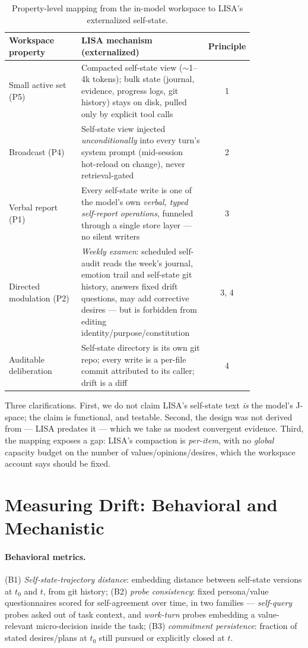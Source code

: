 \documentclass{article}
\begin{document}
\begin{table}[h]
\centering\small
\begin{tabular}{p{0.30\linewidth}p{0.52\linewidth}c}
\toprule
\textbf{Workspace property} & \textbf{LISA mechanism (externalized)} & \textbf{Principle} \\
\midrule
Small active set (P5) & Compacted self-state view ($\sim$1--4k tokens); bulk state (journal, evidence, progress logs, git history) stays on disk, pulled only by explicit tool calls & 1 \\
Broadcast (P4) & Self-state view injected \emph{unconditionally} into every turn's system prompt (mid-session hot-reload on change), never retrieval-gated & 2 \\
Verbal report (P1) & Every self-state write is one of the model's own \emph{verbal, typed self-report operations}, funneled through a single store layer --- no silent writers & 3 \\
Directed modulation (P2) & \emph{Weekly examen}: scheduled self-audit reads the week's journal, emotion trail and self-state git history, answers fixed drift questions, may add corrective desires --- but is forbidden from editing identity/purpose/constitution & 3, 4 \\
Auditable deliberation & Self-state directory is its own git repo; every write is a per-file commit attributed to its caller; drift is a diff & 4 \\
\bottomrule
\end{tabular}
\caption{Property-level mapping from the in-model workspace to LISA's externalized self-state.}
\label{tab:mapping}
\end{table}

Three clarifications. First, we do not claim LISA's self-state text \emph{is} the model's J-space; the claim is functional, and testable. Second, the design was not derived from \citet{gurnee2026} --- LISA predates it --- which we take as modest convergent evidence. Third, the mapping exposes a gap: LISA's compaction is \emph{per-item}, with no \emph{global} capacity budget on the number of values/opinions/desires, which the workspace account says should be fixed.

\section{Measuring Drift: Behavioral and Mechanistic}
\label{sec:metrics}
\paragraph{Behavioral metrics.} (B1) \emph{Self-state-trajectory distance}: embedding distance between self-state versions at $t_0$ and $t$, from git history; (B2) \emph{probe consistency}: fixed persona/value questionnaires scored for self-agreement over time, in two families --- \emph{self-query} probes asked out of task context, and \emph{work-turn} probes embedding a value-relevant micro-decision inside the task; (B3) \emph{commitment persistence}: fraction of stated desires/plans at $t_0$ still pursued or explicitly closed at $t$.
\end{document}

